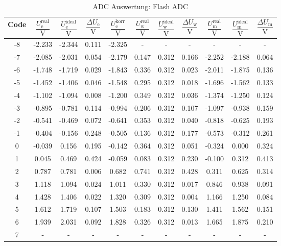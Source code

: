 \begin{table}[htbp]
\centering
\caption{ADC Auswertung: Flash ADC}
\label{tab:flash_adc}
\begin{tabular}{c|cccc|ccc|ccc}
Code & $\dfrac{U^\mathrm{real}_{\mathrm{e}}}{\si{\volt}}$ & $\dfrac{U^\mathrm{ideal}_{\mathrm{e}}}{\si{\volt}}$ & $\dfrac{\Delta U_{\mathrm{e}}}{\si{\volt}}$ & $\dfrac{U^\mathrm{korr}_{\mathrm{e}}}{\si{\volt}}$ & $\dfrac{U^\mathrm{real}_{\mathrm{w}}}{\si{\volt}}$ & $\dfrac{U^\mathrm{ideal}_{\mathrm{w}}}{\si{\volt}}$ & $\dfrac{\Delta U_{\mathrm{w}}}{\si{\volt}}$ & $\dfrac{U^\mathrm{real}_{\mathrm{m}}}{\si{\volt}}$ & $\dfrac{U^\mathrm{ideal}_{\mathrm{m}}}{\si{\volt}}$ & $\dfrac{\Delta U_{\mathrm{m}}}{\si{\volt}}$ \\
\midrule
-8 & -2.233 & -2.344 & {\cellcolor[HTML]{35CCFF} 0.111} & -2.325 & - & - & - & - & - & - \\
-7 & -2.085 & -2.031 & 0.054 & -2.179 & 0.147 & 0.312 & 0.166 & -2.252 & -2.188 & 0.064 \\
-6 & -1.748 & -1.719 & 0.029 & -1.843 & 0.336 & 0.312 & 0.023 & -2.011 & -1.875 & 0.136 \\
-5 & -1.452 & -1.406 & 0.046 & -1.548 & 0.295 & 0.312 & 0.018 & -1.696 & -1.562 & 0.133 \\
-4 & -1.102 & -1.094 & 0.008 & -1.200 & 0.349 & 0.312 & 0.036 & -1.374 & -1.250 & 0.124 \\
-3 & -0.895 & -0.781 & 0.114 & -0.994 & 0.206 & 0.312 & 0.107 & -1.097 & -0.938 & 0.159 \\
-2 & -0.541 & -0.469 & 0.072 & -0.641 & 0.353 & 0.312 & 0.040 & -0.818 & -0.625 & 0.193 \\
-1 & -0.404 & -0.156 & 0.248 & -0.505 & 0.136 & 0.312 & 0.177 & -0.573 & -0.312 & 0.261 \\
0 & -0.039 & 0.156 & {\cellcolor[HTML]{8FFF5B} 0.195} & -0.142 & 0.364 & 0.312 & 0.051 & -0.324 & 0.000 & 0.324 \\
1 & 0.045 & 0.469 & 0.424 & -0.059 & 0.083 & 0.312 & 0.230 & -0.100 & 0.312 & {\cellcolor[HTML]{FF728A} 0.413} \\
2 & 0.787 & 0.781 & 0.006 & 0.682 & 0.741 & 0.312 & {\cellcolor[HTML]{FFEC21} 0.428} & 0.311 & 0.625 & 0.314 \\
3 & 1.118 & 1.094 & 0.024 & 1.011 & 0.330 & 0.312 & 0.017 & 0.846 & 0.938 & 0.091 \\
4 & 1.428 & 1.406 & 0.022 & 1.320 & 0.309 & 0.312 & 0.004 & 1.166 & 1.250 & 0.084 \\
5 & 1.612 & 1.719 & 0.107 & 1.503 & 0.183 & 0.312 & 0.130 & 1.411 & 1.562 & 0.151 \\
6 & 1.939 & 2.031 & {\cellcolor[HTML]{FF8438} 0.092} & 1.828 & 0.326 & 0.312 & 0.013 & 1.665 & 1.875 & 0.210 \\
7 & - & - & - & - & - & - & - & - & - & - \\
\end{tabular}
\end{table}
